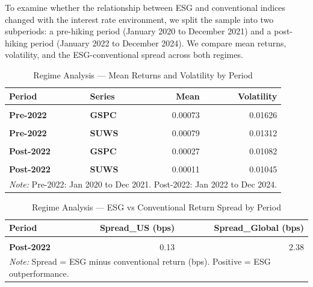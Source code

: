 \documentclass[
]{article}
\begin{document}
To examine whether the relationship between ESG and conventional indices
changed with the interest rate environment, we split the sample into two
subperiods: a pre-hiking period (January 2020 to December 2021) and a
post-hiking period (January 2022 to December 2024). We compare mean
returns, volatility, and the ESG-conventional spread across both
regimes.

\begingroup\fontsize{10}{12}\selectfont

\begin{longtable}[t]{>{}l>{}lrr}
\caption{\label{tab:regime-analysis-returns}Regime Analysis — Mean Returns and Volatility by Period}\\
\toprule
Period & Series & Mean & Volatility\\
\midrule
\textbf{\cellcolor{gray!10}{Pre-2022}} & \textbf{\cellcolor{gray!10}{ESGU}} & \cellcolor{gray!10}{0.00083} & \cellcolor{gray!10}{0.01629}\\
\textbf{Pre-2022} & \textbf{GSPC} & 0.00073 & 0.01626\\
\textbf{\cellcolor{gray!10}{Pre-2022}} & \textbf{\cellcolor{gray!10}{IWDA}} & \cellcolor{gray!10}{0.00064} & \cellcolor{gray!10}{0.01288}\\
\textbf{Pre-2022} & \textbf{SUWS} & 0.00079 & 0.01312\\
\midrule
\textbf{\cellcolor{gray!10}{Post-2022}} & \textbf{\cellcolor{gray!10}{ESGU}} & \cellcolor{gray!10}{0.00029} & \cellcolor{gray!10}{0.01112}\\
\addlinespace
\textbf{Post-2022} & \textbf{GSPC} & 0.00027 & 0.01082\\
\textbf{\cellcolor{gray!10}{Post-2022}} & \textbf{\cellcolor{gray!10}{IWDA}} & \cellcolor{gray!10}{0.00035} & \cellcolor{gray!10}{0.00860}\\
\textbf{Post-2022} & \textbf{SUWS} & 0.00011 & 0.01045\\
\bottomrule
\multicolumn{4}{l}{\rule{0pt}{1em}\textit{Note: } Pre-2022: Jan 2020 to Dec 2021. Post-2022: Jan 2022 to Dec 2024.}\\
\end{longtable}
\endgroup{}

\begingroup\fontsize{10}{12}\selectfont

\begin{longtable}[t]{>{}lrr}
\caption{\label{tab:regime-analysis-spread}Regime Analysis — ESG vs Conventional Return Spread by Period}\\
\toprule
Period & Spread\_US (bps) & Spread\_Global (bps)\\
\midrule
\textbf{\cellcolor{gray!10}{Pre-2022}} & \cellcolor{gray!10}{1.00} & \cellcolor{gray!10}{-1.51}\\
\textbf{Post-2022} & 0.13 & 2.38\\
\bottomrule
\multicolumn{3}{l}{\rule{0pt}{1em}\textit{Note: } Spread = ESG minus conventional return (bps). Positive = ESG outperformance.}\\
\end{longtable}
\endgroup{}
\end{document}
